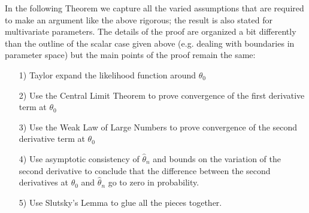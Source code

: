In the following Theorem we capture all the varied assumptions that
are required to make an argument like the above rigorous; the result
is also stated for multivariate parameters.  The details of the proof
are organized a bit differently than the outline of the scalar case
given above (e.g. dealing with boundaries in parameter space) but the
main points of the proof remain the same:
\begin{itemize}
\item[1)] Taylor expand the likelihood function around ${\theta}_0$
\item[2)] Use the Central Limit Theorem to prove convergence of the
  first derivative term at $\theta_0$
\item[3)] Use the Weak Law of Large Numbers to prove convergence of
  the second derivative term at $\theta_0$
\item[4)] Use asymptotic consistency of $\hat{\theta}_n$ and bounds on the variation of the second derivative to
  conclude that the difference between the second derivatives at
  $\theta_0$ and $\hat{\theta}_n$ go to zero in probability.
\item[5)] Use Slutsky's Lemma to glue all the pieces together.
\end{itemize}


